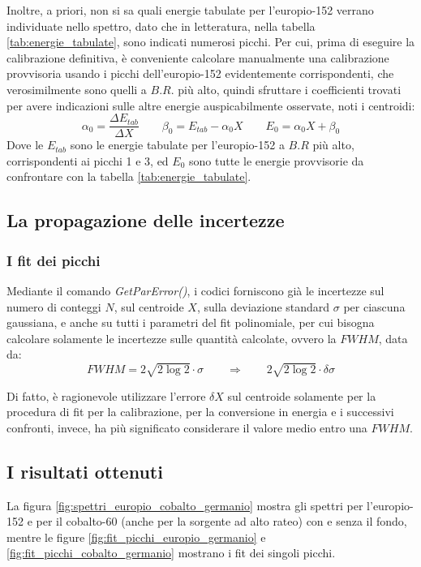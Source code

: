 \documentclass{article}
\begin{document}
                Inoltre, a priori, non si sa quali energie tabulate per l'europio-152 verrano individuate nello spettro, dato che in letteratura, nella tabella \ref{tab:energie_tabulate}, sono indicati numerosi picchi. Per cui, prima di eseguire la calibrazione definitiva, è conveniente calcolare manualmente una calibrazione provvisoria usando i picchi dell'europio-152 evidentemente corrispondenti, che verosimilmente sono quelli a $B.R.$ più alto, quindi sfruttare i coefficienti trovati per avere indicazioni sulle altre energie auspicabilmente osservate, noti i centroidi:
                \begin{equation}\label{for:fit_calibrazione_provvisoria}
                    \alpha_0=\frac{\Delta E_{tab}}{\Delta X}\qquad\beta_0=E_{tab}-\alpha_0X\qquad E_0=\alpha_0X+\beta_0
                \end{equation}
                Dove le $E_{tab}$ sono le energie tabulate per l'europio-152 a $B.R$ più alto, corrispondenti ai picchi 1 e 3, ed $E_0$ sono tutte le energie provvisorie da confrontare con la tabella \ref{tab:energie_tabulate}.

        \subsection*{La propagazione delle incertezze}
            \subsubsection*{I fit dei picchi}
                Mediante il comando \textit{GetParError()}, i codici forniscono già le incertezze sul numero di conteggi $N$, sul centroide $X$, sulla deviazione standard $\sigma$ per ciascuna gaussiana, e anche su tutti i parametri del fit polinomiale, per cui bisogna calcolare solamente le incertezze sulle quantità calcolate, ovvero la $FWHM$, data da:
                    \begin{equation*}\label{for:numero_conteggi}
                        FWHM=2\sqrt{2\log2}\cdot\sigma\qquad\Rightarrow\qquad2\sqrt{2\log2}\cdot\delta\sigma
                    \end{equation*}

                Di fatto, è ragionevole utilizzare l'errore $\delta X$ sul centroide solamente per la procedura di fit per la calibrazione, per la conversione in energia e i successivi confronti, invece, ha più significato considerare il valore medio entro una $FWHM$.

        \subsection*{I risultati ottenuti}
            La figura \ref{fig:spettri_europio_cobalto_germanio} mostra gli spettri per l'europio-152 e per il cobalto-60 (anche per la sorgente ad alto rateo) con e senza il fondo, mentre le figure \ref{fig:fit_picchi_europio_germanio} e \ref{fig:fit_picchi_cobalto_germanio} mostrano i fit dei singoli picchi.
            
\end{document}
